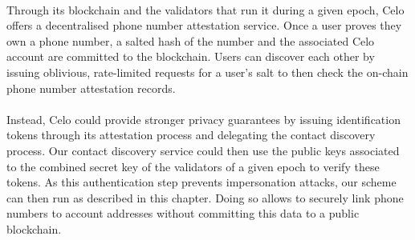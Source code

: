 	\paragraph{} Through its blockchain and the validators that run it during a given epoch, Celo offers a decentralised phone number attestation service. Once a user proves they own a phone number, a salted hash of the number and the associated Celo account are committed to the blockchain. Users can discover each other by issuing oblivious, rate-limited requests for a user's salt to then check the on-chain phone number attestation records.	
	
	\paragraph{} Instead, Celo could provide stronger privacy guarantees by issuing identification tokens through its attestation process and delegating the contact discovery process. Our contact discovery service could then use the public keys associated to the combined secret key of the validators of a given epoch to verify these tokens. As this authentication step prevents impersonation attacks, our scheme can then run as described in this chapter. Doing so allows to securely link phone numbers to account addresses without committing this data to a public blockchain.
	
	
	
	
	
	
	
	
	
	
	
	
	
	
	
	
	
	
	
	
	
	
	
	
